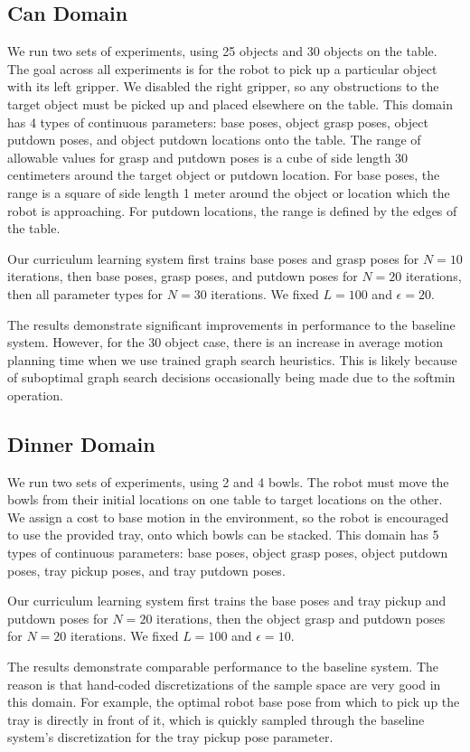 \subsection{Can Domain}
We run two sets of experiments, using 25 objects and 30 objects on the table.
The goal across all experiments is for the robot to pick up a particular object with its
left gripper. We disabled the right gripper, so any obstructions to the target object must be picked up and
placed elsewhere on the table. This domain has 4 types of continuous parameters: base poses, object grasp
poses, object putdown poses, and object putdown locations onto the table. The range of allowable values for
grasp and putdown poses is a cube of side length 30 centimeters around the target object or putdown
location. For base poses, the range is a square of side length 1 meter around the object or location which
the robot is approaching. For putdown locations, the range is defined by the edges of the table.

Our curriculum learning system first trains base poses and grasp poses for $N = 10$ iterations,
then base poses, grasp poses, and putdown poses for $N = 20$ iterations, then all parameter types for $N = 30$ iterations.
We fixed $L = 100$ and $\epsilon = 20$.

The results demonstrate significant improvements in performance to the baseline system. However, for the 30 object case,
there is an increase in average motion planning time when we use trained graph search heuristics. This is likely because of suboptimal graph search
decisions occasionally being made due to the softmin operation.

\subsection{Dinner Domain}
We run two sets of experiments, using 2 and 4 bowls. The robot must move the
bowls from their initial locations on one table to target locations on the other. We assign a cost to
base motion in the environment, so the robot is encouraged to use the provided tray, onto which bowls can be stacked.
This domain has 5 types of continuous parameters: base poses, object grasp poses, object putdown poses, tray pickup
poses, and tray putdown poses.

Our curriculum learning system first trains the base poses and tray pickup and putdown poses for
$N = 20$ iterations, then the object grasp and putdown poses for $N = 20$ iterations. We fixed $L = 100$ and $\epsilon = 10$.

The results demonstrate comparable performance to the baseline system. The reason is that
hand-coded discretizations of the sample space are very good in this domain. For example, the optimal
robot base pose from which to pick up the tray is directly in front of it, which is quickly sampled through
the baseline system's discretization for the tray pickup pose parameter.